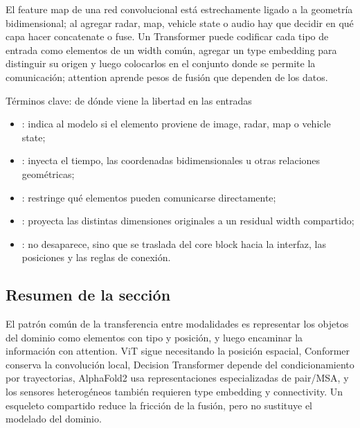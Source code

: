 El feature map de una red convolucional está estrechamente ligado a la geometría bidimensional; al agregar radar, map, vehicle state o audio hay que decidir en qué capa hacer concatenate o fuse. Un Transformer puede codificar cada tipo de entrada como elementos de un width común, agregar un type embedding para distinguir su origen y luego colocarlos en el conjunto donde se permite la comunicación; attention aprende pesos de fusión que dependen de los datos.


\begin{knowledgebox}{Términos clave: de dónde viene la libertad en las entradas}
\begin{itemize}
  \item {}: indica al modelo si el elemento proviene de image, radar, map o vehicle state;
  \item {}: inyecta el tiempo, las coordenadas bidimensionales u otras relaciones geométricas;
  \item {}: restringe qué elementos pueden comunicarse directamente;
  \item {}: proyecta las distintas dimensiones originales a un residual width compartido;
  \item {}: no desaparece, sino que se traslada del core block hacia la interfaz, las posiciones y las reglas de conexión.
\end{itemize}
\end{knowledgebox}


\subsection{Resumen de la sección}

El patrón común de la transferencia entre modalidades es representar los objetos del dominio como elementos con tipo y posición, y luego encaminar la información con attention. ViT sigue necesitando la posición espacial, Conformer conserva la convolución local, Decision Transformer depende del condicionamiento por trayectorias, AlphaFold2 usa representaciones especializadas de pair/MSA, y los sensores heterogéneos también requieren type embedding y connectivity. Un esqueleto compartido reduce la fricción de la fusión, pero no sustituye el modelado del dominio.

